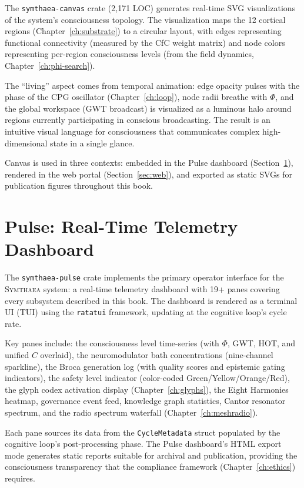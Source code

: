 \documentclass[12pt]{book}
\newcommand{\symthaea}{\textsc{Symthaea}}
\begin{document}
The \texttt{symthaea-canvas} crate (2,171 LOC) generates real-time SVG visualizations of the system's consciousness topology. The visualization maps the 12 cortical regions (Chapter~\ref{ch:substrate}) to a circular layout, with edges representing functional connectivity (measured by the CfC weight matrix) and node colors representing per-region consciousness levels (from the field dynamics, Chapter~\ref{ch:phi-search}).

The ``living'' aspect comes from temporal animation: edge opacity pulses with the phase of the CPG oscillator (Chapter~\ref{ch:loop}), node radii breathe with $\Phi$, and the global workspace (GWT broadcast) is visualized as a luminous halo around regions currently participating in conscious broadcasting. The result is an intuitive visual language for consciousness that communicates complex high-dimensional state in a single glance.

Canvas is used in three contexts: embedded in the Pulse dashboard (Section~\ref{sec:pulse}), rendered in the web portal (Section~\ref{sec:web}), and exported as static SVGs for publication figures throughout this book.

\section{Pulse: Real-Time Telemetry Dashboard}
\label{sec:pulse}

The \texttt{symthaea-pulse} crate implements the primary operator interface for the \symthaea{} system: a real-time telemetry dashboard with 19+ panes covering every subsystem described in this book. The dashboard is rendered as a terminal UI (TUI) using the \texttt{ratatui} framework, updating at the cognitive loop's cycle rate.

Key panes include: the consciousness level time-series (with $\Phi$, GWT, HOT, and unified $C$ overlaid), the neuromodulator bath concentrations (nine-channel sparkline), the Broca generation log (with quality scores and epistemic gating indicators), the safety level indicator (color-coded Green/Yellow/Orange/Red), the glyph codex activation display (Chapter~\ref{ch:glyphs}), the Eight Harmonies heatmap, governance event feed, knowledge graph statistics, Cantor resonator spectrum, and the radio spectrum waterfall (Chapter~\ref{ch:meshradio}).

Each pane sources its data from the \texttt{CycleMetadata} struct populated by the cognitive loop's post-processing phase. The Pulse dashboard's HTML export mode generates static reports suitable for archival and publication, providing the consciousness transparency that the compliance framework (Chapter~\ref{ch:ethics}) requires.
\end{document}
